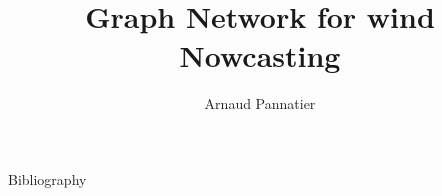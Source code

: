\documentclass[aspectratio=169,fleqn]{beamer}
\author[A. Pannatier]{Arnaud Pannatier}
\title{Graph Network for wind Nowcasting}
\begin{document}
\maketitle

\begin{colorframe}
    \begin{frame}[plain]{Bibliography}
        
        
    \end{frame}
\end{colorframe}
\end{document}

